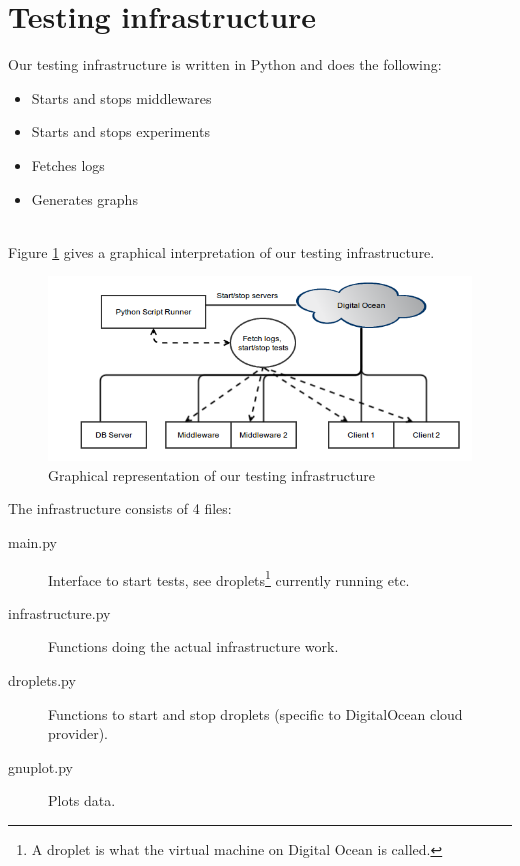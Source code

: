 \documentclass{article}
\begin{document}
    \section{Testing infrastructure}
        Our testing infrastructure is written in Python and does the following:
        \begin{itemize}
            \item Starts and stops middlewares
            \item Starts and stops experiments
            \item Fetches logs
            \item Generates graphs
        \end{itemize}
        ~\\
        Figure \ref{fig:testing_infrastructure} gives a graphical interpretation of our testing infrastructure.\\
         \begin{figure}[H]
             \centering
             \centerline{\includegraphics[scale=0.50]{testing_infrastructure}}
             \caption{Graphical representation of our testing infrastructure}
             \label{fig:testing_infrastructure}
         \end{figure}
        The infrastructure consists of 4 files:
        \begin{description}
            \item[main.py] Interface to start tests, see droplets\footnote{A droplet is what the virtual machine on Digital Ocean is called.} currently running etc.
            \item[infrastructure.py] Functions doing the actual infrastructure work.
            \item[droplets.py] Functions to start and stop droplets (specific to DigitalOcean cloud provider).
            \item[gnuplot.py] Plots data.
        \end{description}
\end{document}
